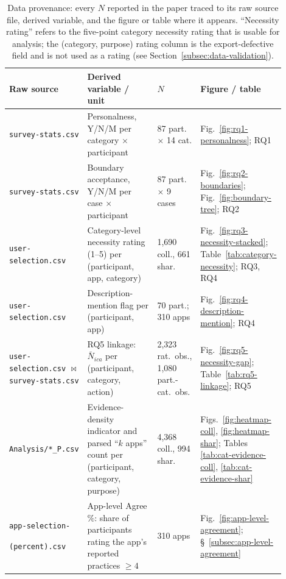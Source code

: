 \documentclass[11pt,a4paper]{article}
\begin{document}
\begin{table}[t]
\centering
\caption{Data provenance: every $N$ reported in the paper traced to
its raw source file, derived variable, and the figure or table where
it appears. ``Necessity rating'' refers to the five-point category
necessity rating that is usable for analysis; the (category, purpose)
rating column is the export-defective field and is not used as a
rating (see Section~\ref{subsec:data-validation}).}
\label{tab:provenance}
\small
\begin{tabular}{p{0.20\linewidth}p{0.30\linewidth}p{0.10\linewidth}p{0.30\linewidth}}
\toprule
\textbf{Raw source} & \textbf{Derived variable / unit} & \textbf{$N$}
                   & \textbf{Figure / table} \\
\midrule
\texttt{survey-stats.csv}
  & Personalness, Y/N/M per category $\times$ participant
  & 87 part.\ $\times$ 14 cat.
  & Fig.~\ref{fig:rq1-personalness}; RQ1 \\
\texttt{survey-stats.csv}
  & Boundary acceptance, Y/N/M per case $\times$ participant
  & 87 part.\ $\times$ 9 cases
  & Fig.~\ref{fig:rq2-boundaries}; Fig.~\ref{fig:boundary-tree}; RQ2 \\
\texttt{user-selection.csv}
  & Category-level necessity rating (1--5) per (participant, app, category)
  & 1{,}690 coll., 661 shar.
  & Fig.~\ref{fig:rq3-necessity-stacked};
    Table~\ref{tab:category-necessity}; RQ3, RQ4 \\
\texttt{user-selection.csv}
  & Description-mention flag per (participant, app)
  & 70 part.; 310 apps
  & Fig.~\ref{fig:rq4-description-mention}; RQ4 \\
\texttt{user-selection.csv} $\bowtie$ \texttt{survey-stats.csv}
  & RQ5 linkage: $\bar{N}_{ica}$ per (participant, category, action)
  & 2{,}323 rat.\ obs., 1{,}080 part.-cat.\ obs.
  & Fig.~\ref{fig:rq5-necessity-gap}; Table~\ref{tab:rq5-linkage}; RQ5 \\
\texttt{Analysis/*\_P.csv}
  & Evidence-density indicator and parsed ``$k$ apps'' count per
    (participant, category, purpose)
  & 4{,}368 coll., 994 shar.
  & Figs.~\ref{fig:heatmap-coll}, \ref{fig:heatmap-shar};
    Tables \ref{tab:cat-evidence-coll}, \ref{tab:cat-evidence-shar} \\
\texttt{app-selection-}\par\texttt{(percent).csv}
  & App-level Agree $\%$: share of participants rating the app's
    reported practices $\geq 4$
  & 310 apps
  & Fig.~\ref{fig:app-level-agreement}; \S~\ref{subsec:app-level-agreement} \\
\bottomrule
\end{tabular}
\end{table}
\end{document}
